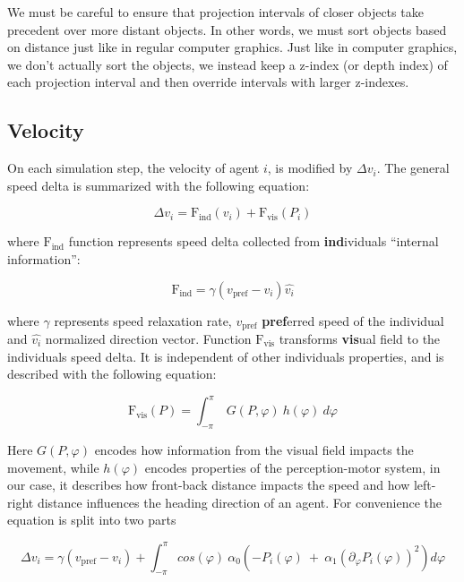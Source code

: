 \documentclass[9pt]{pnas-new}
\begin{document}
We must be careful to ensure that projection intervals of closer objects take precedent over more distant objects.
In other words, we must sort objects based on distance just like in regular computer graphics.
Just like in computer graphics, we don't actually sort the objects, we instead keep a z-index (or depth index) of each projection interval and then override intervals with larger z-indexes.





\subsection{Velocity}

On each simulation step, the velocity of agent $i$, is modified by $\Delta v_i$.
The general speed delta is summarized with the following equation:

\begin{equation}
    \Delta v_i = \text{F}_{\text{ind}}(v_i) + \text{F}_{\text{vis}}(P_i)
\end{equation}

where $\text{F}_{\text{ind}}$ function represents speed delta collected from \textbf{ind}ividuals ``internal information'':

\begin{equation}
    \text{F}_{\text{ind}} = \gamma(v_\text{pref} - v_i)\hat{v_i}
\end{equation}

where $\gamma$ represents speed relaxation rate, $v_\text{pref}$ \textbf{pref}erred speed of the individual and $\hat{v_i}$ normalized direction vector.
Function $\text{F}_{\text{vis}}$ transforms \textbf{vis}ual field to the individuals speed delta.
It is independent of other individuals properties, and is described with the following equation:

\begin{equation}
    \text{F}_{\text{vis}}(P) = \int_{-\pi}^{\pi} \ G(P, \varphi) \ h(\varphi) \ d\varphi
\end{equation}

Here $G(P, \varphi)$ encodes how information from the visual field impacts the movement, while $h(\varphi)$ encodes properties of the perception-motor system, in our case, it describes how front-back distance impacts the speed and how left-right distance influences the heading direction of an agent.
For convenience the equation is split into two parts
\sloppy

\begin{equation}
    \Delta v_i = \gamma(v_\text{pref} - v_i) +
        \int_{-\pi}^{\pi} cos(\varphi) \ \alpha_0
        \left(
            -P_i(\varphi) \ + \ \alpha_1 (\partial_{\varphi} P_i(\varphi))^2
        \right) d\varphi
    \label{eq:speed}
\end{equation}
\end{document}
